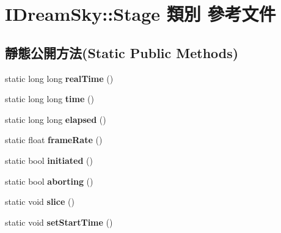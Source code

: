 \hypertarget{class_i_dream_sky_1_1_stage}{}\section{I\+Dream\+Sky\+:\+:Stage 類別 參考文件}
\label{class_i_dream_sky_1_1_stage}
\subsection*{靜態公開方法(Static Public Methods)}
\begin{DoxyCompactItemize}
\item 
static long long {\bfseries real\+Time} ()\hypertarget{class_i_dream_sky_1_1_stage_a39506f2df00db8bf46500ffb7e814d40}{}\label{class_i_dream_sky_1_1_stage_a39506f2df00db8bf46500ffb7e814d40}

\item 
static long long {\bfseries time} ()\hypertarget{class_i_dream_sky_1_1_stage_a154e07e0a3d16eb949ca8af19ca9861a}{}\label{class_i_dream_sky_1_1_stage_a154e07e0a3d16eb949ca8af19ca9861a}

\item 
static long long {\bfseries elapsed} ()\hypertarget{class_i_dream_sky_1_1_stage_aa003664008e1bb0d664a5ede8fb8f49c}{}\label{class_i_dream_sky_1_1_stage_aa003664008e1bb0d664a5ede8fb8f49c}

\item 
static float {\bfseries frame\+Rate} ()\hypertarget{class_i_dream_sky_1_1_stage_a8fc78bf08b50b62f4b690b1c90b5dfc2}{}\label{class_i_dream_sky_1_1_stage_a8fc78bf08b50b62f4b690b1c90b5dfc2}

\item 
static bool {\bfseries initiated} ()\hypertarget{class_i_dream_sky_1_1_stage_ad677fa0deb5f2ca185c1663f81a98cdb}{}\label{class_i_dream_sky_1_1_stage_ad677fa0deb5f2ca185c1663f81a98cdb}

\item 
static bool {\bfseries aborting} ()\hypertarget{class_i_dream_sky_1_1_stage_a256cdce0ee3abd36e7d389c56b31f20d}{}\label{class_i_dream_sky_1_1_stage_a256cdce0ee3abd36e7d389c56b31f20d}

\item 
static void {\bfseries slice} ()\hypertarget{class_i_dream_sky_1_1_stage_a5d71d6bfc0a6fbba2025315a9a47960b}{}\label{class_i_dream_sky_1_1_stage_a5d71d6bfc0a6fbba2025315a9a47960b}

\item 
static void {\bfseries set\+Start\+Time} ()\hypertarget{class_i_dream_sky_1_1_stage_acac2f16f2b374db698a5782219f83793}{}\label{class_i_dream_sky_1_1_stage_acac2f16f2b374db698a5782219f83793}


\end{DoxyCompactItemize}
